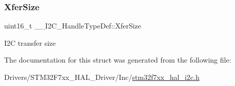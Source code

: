 \subsubsection{\texorpdfstring{XferSize}{XferSize}}
{\footnotesize\ttfamily uint16\+\_\+t \+\_\+\+\_\+\+I2\+C\+\_\+\+Handle\+Type\+Def\+::\+Xfer\+Size}

I2C transfer size 

The documentation for this struct was generated from the following file\+:\begin{DoxyCompactItemize}
\item 
Drivers/\+S\+T\+M32\+F7xx\+\_\+\+H\+A\+L\+\_\+\+Driver/\+Inc/\mbox{\hyperlink{stm32f7xx__hal__i2c_8h}{stm32f7xx\+\_\+hal\+\_\+i2c.\+h}}\end{DoxyCompactItemize}
